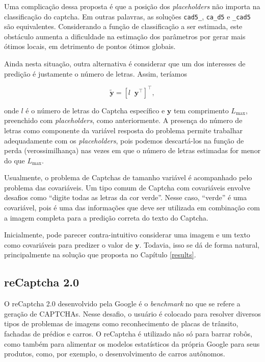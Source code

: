 \documentclass[12pt,]{report}
\begin{document}
Uma complicação dessa proposta é que a posição dos \emph{placeholders} não importa na classificação do captcha. Em outras palavras, as soluções \texttt{cad5\_}, \texttt{ca\_d5} e \texttt{\_cad5} são equivalentes. Considerando a função de classificação a ser estimada, este obstáculo aumenta a dificuldade na estimação dos parâmetros por gerar mais ótimos locais, em detrimento de pontos ótimos globais.

Ainda nesta situação, outra alternativa é considerar que um dos interesses de predição é justamente o número de letras. Assim, teríamos

\[
\tilde{\mathbf{y}} = \left[l \;\; \mathbf y^\top \right]^\top,
\]

onde \(l\) é o número de letras do Captcha específico e \(\mathbf y\) tem comprimento \(L_{\max}\), preenchido com \emph{placeholders}, como anteriormente. A presença do número de letras como componente da variável resposta do problema permite trabalhar adequadamente com os \emph{placeholders}, pois podemos descartá-los na função de perda (verossimilhança) nas vezes em que o número de letras estimadas for menor do que \(L_{\max}\).

Usualmente, o problema de Captchas de tamanho variável é acompanhado pelo problema das covariáveis. Um tipo comum de Captcha com covariáveis envolve desafios como ``digite todas as letras da cor verde''. Nesse caso, ``verde'' é uma covariável, pois é uma das informações que deve ser utilizada em combinação com a imagem completa para a predição correta do texto do Captcha.

Inicialmente, pode parecer contra-intuitivo considerar uma imagem e um texto como covariáveis para predizer o valor de \(\mathbf y\). Todavia, isso se dá de forma natural, principalmente na solução que proposta no Capítulo \ref{results}.

\hypertarget{recaptcha-2.0}{%
\subsection{reCaptcha 2.0}\label{recaptcha-2.0}}

O reCaptcha 2.0 desenvolvido pela Google é o \emph{benchmark} no que se refere a geração de CAPTCHAs. Nesse desafio, o usuário é colocado para resolver diversos tipos de problemas de imagens como reconhecimento de placas de trânsito, fachadas de prédios e carros. O reCaptcha é utilizado não só para barrar robôs, como também para alimentar os modelos estatísticos da própria Google para seus produtos, como, por exemplo, o desenvolvimento de carros autônomos.
\end{document}
